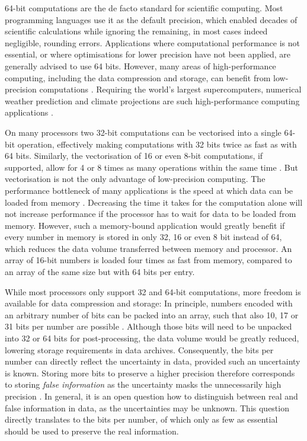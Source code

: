 64-bit computations are the de facto standard for scientific computing. Most programming languages use
it as the default precision, which enabled decades of scientific calculations while ignoring the remaining,
in most cases indeed negligible, rounding errors. Applications where computational performance is not essential,
or where optimisations for lower precision have not been applied, are generally advised to use 64 bits.
However, many areas of high-performance computing, including the data compression and storage,
can benefit from low-precision computations \citep{Palmer2015}. Requiring the world's largest supercomputers,
numerical weather prediction and climate projections are such high-performance computing applications \citep{Bauer2021a}.

On many processors two 32-bit computations can be vectorised into a single 64-bit operation, effectively
making computations with 32 bits twice as fast as with 64 bits. Similarly, the vectorisation of 16 or even 8-bit
computations, if supported, allow for 4 or 8 times as many operations within the same time \citep{Sato2020}.
But vectorisation is not the only advantage of low-precision computing. The performance bottleneck of many
applications is the speed at which data can be loaded from memory \citep{Muller2019a}. Decreasing the time
it takes for the computation alone will not increase performance if the processor has to wait for data to be loaded
from memory. However, such a memory-bound application would greatly benefit if every number in memory is stored
in only 32, 16 or even 8 bit instead of 64, which reduces the data volume transferred between memory and processor.
An array of 16-bit numbers is loaded four times as fast from memory, compared to an array of the same size but with
64 bits per entry.

While most processors only support 32 and 64-bit computations, more freedom is available for data compression and storage:
In principle, numbers encoded with an arbitrary number of bits can be packed into an array, such that also
10, 17 or 31 bits per number are possible \citep{WMO2003}. Although those bits will need to be unpacked into 32 or 64 bits for 
post-processing, the data volume would be greatly reduced, lowering storage requirements in data archives.
Consequently, the bits per number can directly reflect the uncertainty in data, provided such an uncertainty is known.
Storing more bits to preserve a higher precision therefore corresponds to storing \emph{false information} as the
uncertainty masks the unnecessarily high precision \citep{Jeffress2017}. In general, it is an open question how to distinguish between
real and false information in data, as the uncertainties may be unknown. This question directly translates to
the bits per number, of which only as few as essential should be used to preserve the real information.

